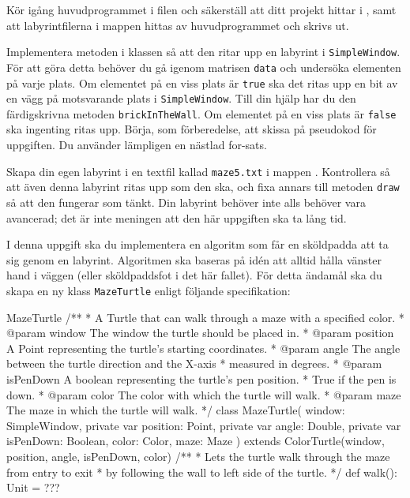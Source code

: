 \Task Kör igång huvudprogrammet i filen  och säkerställ att ditt projekt hittar  i , samt att labyrintfilerna i mappen  hittas av huvudprogrammet och skrivs ut.

\Task Implementera metoden  i klassen  så att den ritar upp en labyrint i \texttt{SimpleWindow}. 
För att göra detta behöver du gå igenom matrisen \texttt{data} och undersöka elementen på varje plats. Om elementet på en viss plats är \texttt{true} ska det ritas upp en bit av en vägg på motsvarande plats i \texttt{SimpleWindow}. Till din hjälp har du den färdigskrivna metoden \texttt{brickInTheWall}. Om elementet på en viss plats är \texttt{false} ska ingenting ritas upp.
Börja, som förberedelse, att skissa på pseudokod för uppgiften. Du använder lämpligen en nästlad for-sats.


\Task Skapa din egen labyrint i en textfil kallad \texttt{maze5.txt} i mappen . Kontrollera så att även denna labyrint ritas upp som den ska, och fixa annars till metoden \texttt{draw} så att den fungerar som tänkt. Din labyrint behöver inte alls behöver vara avancerad; det är inte meningen att den här uppgiften ska ta lång tid.


\Task I denna uppgift ska du implementera en algoritm som får en sköldpadda att ta sig genom en labyrint. Algoritmen ska baseras på idén att alltid hålla vänster hand i väggen (eller sköldpaddsfot i det här fallet). För detta ändamål ska du skapa en ny klass \texttt{MazeTurtle} enligt följande specifikation:

\begin{ScalaSpec}{MazeTurtle}
/**
 * A Turtle that can walk through a maze with a specified color.
 * @param window    The window the turtle should be placed in.
 * @param position  A Point representing the turtle's starting coordinates.
 * @param angle     The angle between the turtle direction and the X-axis 
 *                  measured in degrees.
 * @param isPenDown A boolean representing the turtle's pen position. 
 *                  True if the pen is down.
 * @param color     The color with which the turtle will walk.
 * @param maze      The maze in which the turtle will walk.
 */
class MazeTurtle(
    window: SimpleWindow, 
    private var position: Point,
    private var angle: Double, 
    private var isPenDown: Boolean,
    color: Color, 
    maze: Maze
  ) extends ColorTurtle(window, position, angle, isPenDown, color) {
  /**
   * Lets the turtle walk through the maze from entry to exit 
   * by following the wall to left side of the turtle.
   */
  def walk(): Unit = ???
}

\end{ScalaSpec}

